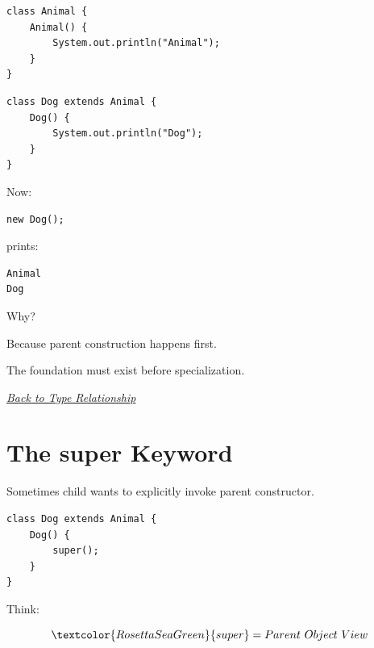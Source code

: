 \documentclass[11pt,a4paper]{book}
\begin{document}
\begin{verbatim}
class Animal {
    Animal() {
        System.out.println("Animal");
    }
}
\end{verbatim}


\begin{verbatim}
class Dog extends Animal {
    Dog() {
        System.out.println("Dog");
    }
}
\end{verbatim}


Now:

\begin{verbatim}
new Dog();
\end{verbatim}

prints:

\begin{verbatim}
Animal
Dog
\end{verbatim}


Why?

Because parent construction happens first.


The foundation must exist before specialization.

\smallskip
\noindent
\hyperref[sec:inheritance_type_relationship]{\emph{Back to Type Relationship}}


\section{The super Keyword}\label{sec:inheritance_super_keyword}

Sometimes child wants to explicitly invoke parent constructor.


\begin{verbatim}
class Dog extends Animal {
    Dog() {
        super();
    }
}
\end{verbatim}


Think:

\[
\textcolor{RosettaSeaGreen}{super}
=
Parent\ Object\ View
\]
\end{document}
